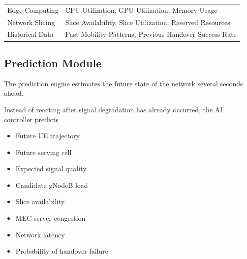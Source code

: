 \documentclass[12pt,a4paper]{article}\usepackage[a4paper,margin=1in]{geometry}\usepackage{graphicx}\usepackage{longtable}\usepackage{booktabs}\usepackage{hyperref}\usepackage{enumitem}\usepackage{amsmath}\usepackage{tikz}\usepackage{pgfgantt}\usepackage{setspace}\setstretch{1.15}\usetikzlibrary{positioning,arrows.meta,shapes.geometric}
\begin{document}
\begin{table}[h]
\begin{tabular}{p{4cm}p{9cm}}
			Edge Computing
			
			&
			
			CPU Utilization, GPU Utilization, Memory Usage
			
			\\
			
			Network Slicing
			
			&
			
			Slice Availability, Slice Utilization, Reserved Resources
			
			\\
			
			Historical Data
			
			&
			
			Past Mobility Patterns, Previous Handover Success Rate
			
			\\
			
			\bottomrule
			
		\end{tabular}
		
	\end{table}
	
	
	\subsection{Prediction Module}
	
	The prediction engine estimates the future state of the network several seconds ahead.
	
	Instead of reacting after signal degradation has already occurred, the AI controller predicts
	
	\begin{itemize}
		
		\item Future UE trajectory
		
		\item Future serving cell
		
		\item Expected signal quality
		
		\item Candidate gNodeB load
		
		\item Slice availability
		
		\item MEC server congestion
		
		\item Network latency
		
		\item Probability of handover failure
		
	\end{itemize}
	
\end{document}
